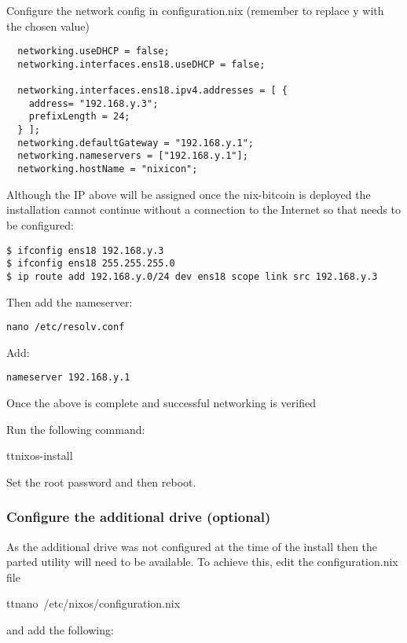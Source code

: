 Configure the network config in configuration.nix (remember to replace y
with the chosen value)

\begin{verbatim}
  networking.useDHCP = false;
  networking.interfaces.ens18.useDHCP = false;

  networking.interfaces.ens18.ipv4.addresses = [ {
    address= "192.168.y.3";
    prefixLength = 24;
  } ];
  networking.defaultGateway = "192.168.y.1";
  networking.nameservers = ["192.168.y.1"];
  networking.hostName = "nixicon";
\end{verbatim}

Although the IP above will be assigned once the nix-bitcoin is deployed
the installation cannot continue without a connection to the Internet so
that needs to be configured:

\begin{verbatim}
$ ifconfig ens18 192.168.y.3
$ ifconfig ens18 255.255.255.0
$ ip route add 192.168.y.0/24 dev ens18 scope link src 192.168.y.3
\end{verbatim}

Then add the nameserver:

\begin{verbatim}
nano /etc/resolv.conf
\end{verbatim}

Add:

\begin{verbatim}
nameserver 192.168.y.1
\end{verbatim}

Once the above is complete and successful networking is verified

Run the following command:

tt{nixos-install}

Set the root password and then reboot.

\hypertarget{configure-the-additional-drive-optional}{%
\subsubsection{Configure the additional drive
(optional)}\label{configure-the-additional-drive-optional}}

As the additional drive was not configured at the time of the install
then the parted utility will need to be available. To achieve this, edit
the configuration.nix file

tt{nano\ /etc/nixos/configuration.nix}

and add the following:

